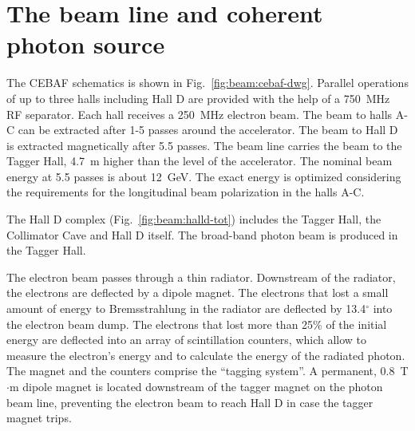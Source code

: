 
\section[The beam line and coherent photon source (TCR)]{The beam line and coherent photon source \label{sec:beamline}}

The CEBAF schematics is shown in Fig.~\ref{fig:beam:cebaf-dwg}.
Parallel operations of up to three halls including Hall D are provided
with the help of a 750~MHz RF separator. Each hall receives a 250~MHz
electron beam. The beam to halls A-C can be extracted after 1-5 passes
around the accelerator. The beam to Hall D is extracted magnetically
after 5.5 passes. The beam line carries the beam to the Tagger Hall,
4.7~m higher than the level of the accelerator.  The nominal beam
energy at 5.5 passes is about 12~GeV. The exact energy is optimized
considering the requirements for the longitudinal beam polarization in
the halls A-C.

The Hall D complex (Fig.~\ref{fig:beam:halld-tot}) includes the Tagger
Hall, the Collimator Cave and Hall D itself. The broad-band photon
beam is produced in the Tagger Hall.

The electron beam passes through a thin radiator. Downstream of the
radiator, the electrons are deflected by a dipole magnet. The
electrons that lost a small amount of energy to Bremsstrahlung in the
radiator are deflected by 13.4$^\circ$ into the electron beam dump.
The electrons that lost more than 25\% of the initial energy are
deflected into an array of scintillation counters, which allow to
measure the electron's energy and to calculate the energy of the
radiated photon. The magnet and the counters comprise the ``tagging
system''. A permanent, 0.8~T$\cdot$m dipole magnet is located
downstream of the tagger magnet on the photon beam line, preventing
the electron beam to reach Hall D in case the tagger magnet trips.

